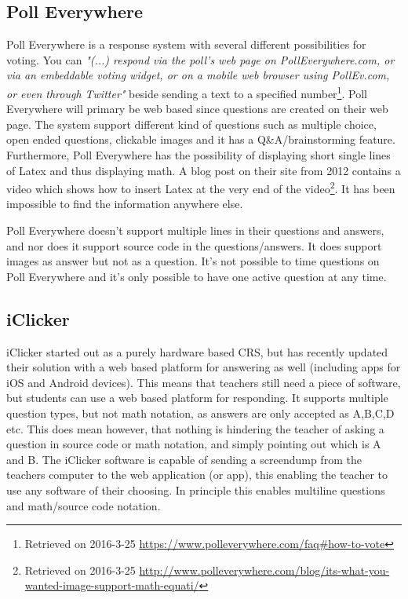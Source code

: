 \subsection{Poll Everywhere}
Poll Everywhere is a response system with several different possibilities for voting. You can \emph{"(...) respond via the poll's web page on PollEverywhere.com, or via an embeddable voting widget, or on a mobile web browser using PollEv.com, or even through Twitter"} beside sending a text to a specified number\footnote{Retrieved on 2016-3-25 \url{https://www.polleverywhere.com/faq\#how-to-vote}}. Poll Everywhere will primary be web based since questions are created on their web page. The system support different kind of questions such as multiple choice, open ended questions, clickable images and it has a Q\&A/brainstorming feature. Furthermore, Poll Everywhere has the possibility of displaying short single lines of Latex and thus displaying math. A blog post on their site from 2012 contains a video which shows how to insert Latex at the very end of the video\footnote{Retrieved on 2016-3-25 \url{http://www.polleverywhere.com/blog/its-what-you-wanted-image-support-math-equati/}}. It has been impossible to find the information anywhere else.

Poll Everywhere doesn't support multiple lines in their questions and answers, and nor does it support source code in the questions/answers. It does support images as answer but not as a question. It's not possible to time questions on Poll Everywhere and it's only possible to have one active question at any time. 


\subsection{iClicker}
iClicker started out as a purely hardware based CRS, but has recently updated their solution with a web based platform for answering as well (including apps for iOS and Android devices). This means that teachers still need a piece of software, but students can use a web based platform for responding. It supports multiple question types, but not math notation, as answers are only accepted as A,B,C,D etc. This does mean however, that nothing is hindering the teacher of asking a question in source code or math notation, and simply pointing out which is A and B. The iClicker software is capable of sending a screendump from the teachers computer to the web application (or app), this enabling the teacher to use any software of their choosing. In principle this enables multiline questions and math/source code notation.


